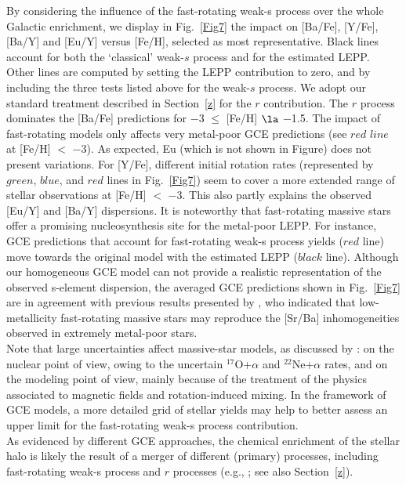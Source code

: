 \documentclass[manuscript]{aastex}
\begin{document}
By considering the influence of the fast-rotating weak-s process over the whole Galactic
enrichment, we display in Fig.~\ref{Fig7} the impact on [Ba/Fe], [Y/Fe], [Ba/Y] and [Eu/Y] 
versus [Fe/H], selected as most representative.
Black lines account for both the `classical' weak-$s$ process and 
for the estimated LEPP. 
Other lines are computed by setting the LEPP contribution to zero, and by including
the three tests listed above for the weak-$s$ process. 
We adopt our standard treatment described in Section~\ref{z} for the $r$ contribution.
The $r$ process dominates the [Ba/Fe] predictions for $-$3 $\leq$ [Fe/H] $\la$ $-$1.5.
The impact of fast-rotating models only affects very metal-poor GCE predictions (see
$red$ $line$ at [Fe/H] $<$ $-$3).
As expected, Eu (which is not shown in Figure) does not present variations.
For [Y/Fe], different initial rotation rates (represented by $green$, $blue$, and 
$red$ lines in Fig.~\ref{Fig7}) seem to cover a more extended range of stellar 
observations at [Fe/H] $<$ $-$3. This also partly explains the observed [Eu/Y] and 
[Ba/Y] dispersions. 
It is noteworthy that fast-rotating massive stars offer a 
promising nucleosynthesis site for the metal-poor LEPP. For instance, GCE predictions 
that account for fast-rotating weak-s process yields ($red$ line) move towards the original
model with the estimated LEPP ($black$ line). 
Although our homogeneous GCE model can not provide a realistic representation of 
the observed s-element dispersion, the averaged GCE predictions shown in Fig.~\ref{Fig7}
are in agreement with previous results presented by \citet{cescutti13}, who indicated
that low-metallicity fast-rotating massive stars may reproduce the [Sr/Ba] inhomogeneities
observed in extremely metal-poor stars.
\\
Note that large uncertainties affect massive-star models, as discussed
by \citet{fris16}: on the nuclear point of view, owing to the uncertain $^{17}$O+$\alpha$ 
and $^{22}$Ne+$\alpha$ rates, and on the modeling point of view, mainly because of the 
treatment of the physics associated to magnetic fields and rotation-induced mixing. 
In the framework of GCE models, a more detailed grid of stellar yields may help to better 
assess an upper limit for the fast-rotating weak-s process contribution.
\\
As evidenced by different GCE approaches, the chemical enrichment of the stellar halo 
 is likely the result of a merger of different (primary) processes, including 
fast-rotating weak-s process and $r$ processes (e.g., 
\citealt{ishimaru99,argast04,cescutti08,matteucci14};
see also Section~\ref{z}). 
\end{document}
